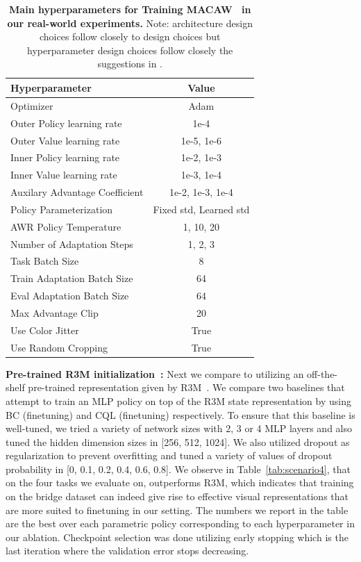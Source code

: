 \documentclass[../thesis.tex]{subfiles}
\begin{document}
\begin{table}[h]
\centering
\begin{tabular}{l|c}
\toprule
\textbf{Hyperparameter} & \textbf{Value}\\  \midrule
Optimizer & Adam \\
Outer Policy learning rate & 1e-4 \\
Outer Value learning rate & 1e-5, 1e-6 \\
Inner Policy learning rate & 1e-2, 1e-3 \\
Inner Value learning rate & 1e-3, 1e-4 \\
Auxilary Advantage Coefficient & 1e-2, 1e-3, 1e-4 \\
Policy Parameterization & Fixed std, Learned std \\
AWR Policy Temperature & 1, 10, 20 \\
Number of Adaptation Steps & 1, 2, 3 \\
Task Batch Size & 8 \\
Train Adaptation Batch Size & 64 \\
Eval Adaptation Batch Size & 64 \\
Max Advantage Clip & 20 \\
Use Color Jitter & True \\
Use Random Cropping & True \\

\bottomrule
\end{tabular}
\vspace{0.07cm}
\caption{{\footnotesize{\textbf{Main hyperparameters for Training MACAW~\citep{mitchell2021offline} in our real-world experiments.} Note: architecture design choices follow closely to \ptrmethodname design choices but hyperparameter design choices follow closely the suggestions in \citet{mitchell2021offline}.}}}
\label{tab:hparams_macaw}
\vspace{-0.2cm}
\end{table}

\textbf{Pre-trained R3M initialization~\citep{nair2022r3m}:} Next we compare \ptrmethodname to utilizing an off-the-shelf pre-trained representation given by R3M~\citep{nair2022r3m}. We compare two baselines that attempt to train an MLP policy on top of the R3M state representation by using BC (finetuning) and CQL (finetuning) respectively. To ensure that this baseline is well-tuned, we tried a variety of network sizes with 2, 3 or 4 MLP layers and also tuned the hidden dimension sizes in [256, 512, 1024]. We also utilized dropout as regularization to prevent overfitting and tuned a variety of values of dropout probability in [0, 0.1, 0.2, 0.4, 0.6, 0.8]. We observe in Table~\ref{tab:scenario4}, that on the four tasks we evaluate on, \ptrmethodname outperforms R3M, which indicates that training on the bridge dataset can indeed give rise to effective visual representations that are more suited to finetuning in our setting. The numbers we report in the table are the best over each parametric policy corresponding to each hyperparameter in our ablation. Checkpoint selection was done utilizing early stopping which is the last iteration where the validation error stops decreasing. 
\end{document}
